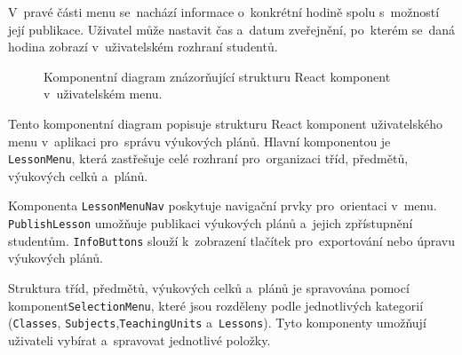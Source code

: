 \documentclass[male,czech,api_bc]{kitheses}
\begin{document}
V~pravé části menu se~nachází informace o~konkrétní hodině spolu s~možností její publikace. Uživatel může nastavit čas a~datum zveřejnění, po~kterém se~daná hodina zobrazí v~uživatelském rozhraní studentů.

\begin{figure}[H]
	\centering
	\caption{Komponentní diagram znázorňující strukturu React komponent v~uživatelském menu.}
	\label{fig:component-diagram-react-2}
\end{figure}

Tento komponentní diagram popisuje strukturu React komponent uživatelského menu v~aplikaci pro~správu výukových plánů. Hlavní komponentou je \texttt{LessonMenu}, která zastřešuje celé rozhraní pro~organizaci tříd, předmětů, výukových celků a~plánů.

Komponenta \texttt{LessonMenuNav} poskytuje navigační prvky pro~orientaci v~menu. \texttt{PublishLesson} umožňuje publikaci výukových plánů a~jejich zpřístupnění studentům. \texttt{InfoButtons} slouží k~zobrazení tlačítek pro~exportování nebo úpravu výukových plánů.

Struktura tříd, předmětů, výukových celků a~plánů je spravována pomocí komponent\break\texttt{SelectionMenu}, které jsou rozděleny podle jednotlivých kategorií (\texttt{Classes}, \texttt{Subjects},\break\texttt{TeachingUnits} a~\texttt{Lessons}). Tyto komponenty umožňují uživateli vybírat a~spravovat jednotlivé položky.
\end{document}
